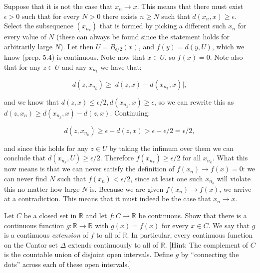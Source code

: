 \begin{solution}
    
    Suppose that it is not the case that $x_n \rightarrow x$.
    This means that there must exist $\epsilon > 0$ such that for every $N > 0$ there exists $n \geq N$ such that $d(x_n, x) \geq \epsilon$.
    Select the subsequence $(x_{n_k})$ that is formed by picking a different such $x_n$ for every value of $N$ (these can always be found since the statement holds for arbitrarily large $N$).
    Let then $U = B_{\epsilon/2}(x)$, and $f(y) = d(y, U)$, which we know (prep. 5.4) is continuous.
    Note now that $x \in U$, so $f(x) = 0$.
    Note also that for any $z \in U$ and any $x_{n_k}$ we have that:

    \[d(z, x_{n_k}) \geq \lvert d(z, x) - d(x_{n_k}, x) \rvert,\]

    and we know that $d(z, x) \leq \epsilon/2, d(x_{n_k}, x) \geq \epsilon$, so we can rewrite this as $d(z, x_n) \geq d(x_{n_k}, x) - d(z, x)$.
    Continuing:

    \[d(z, x_{n_k}) \geq \epsilon - d(z, x) > \epsilon - \epsilon/2 = \epsilon/2,\]

    and since this holds for any $z \in U$ by taking the infimum over them we can conclude that $d(x_{n_k}, U) \geq \epsilon/2$.
    Therefore $f(x_{n_k}) \geq \epsilon/2$ for all $x_{n_k}$.
    What this now means is that we can never satisfy the definition of $f(x_n) \rightarrow f(x) = 0$: we can never find $N$ such that $f(x_{n}) < \epsilon/2$, since at least one such $x_{n_k}$ will violate this no matter how large $N$ is.
    Because we are given $f(x_n) \rightarrow f(x)$, we arrive at a contradiction.
    This means that it must indeed be the case that $x_n \rightarrow x$.
\end{solution}

\begin{exercise}{41}
    Let $C$ be a closed set in $\mathbb{R}$ and let $f: C \rightarrow \mathbb{R}$ be continuous.
    Show that there is a continuous function $g: \mathbb{R} \rightarrow \mathbb{R}$ with $g(x) = f(x)$ for every $x \in C$.
    We say that $g$ is a continuous \textit{extension} of $f$ to all of $\mathbb{R}$.
    In particular, every continuous function on the Cantor set $\Delta$ extends continuously to all of $\mathbb{R}$.
    [Hint: The complement of $C$ is the countable union of disjoint open intervals.
    Define $g$ by ``connecting the dots'' across each of these open intervals.]
\end{exercise}

